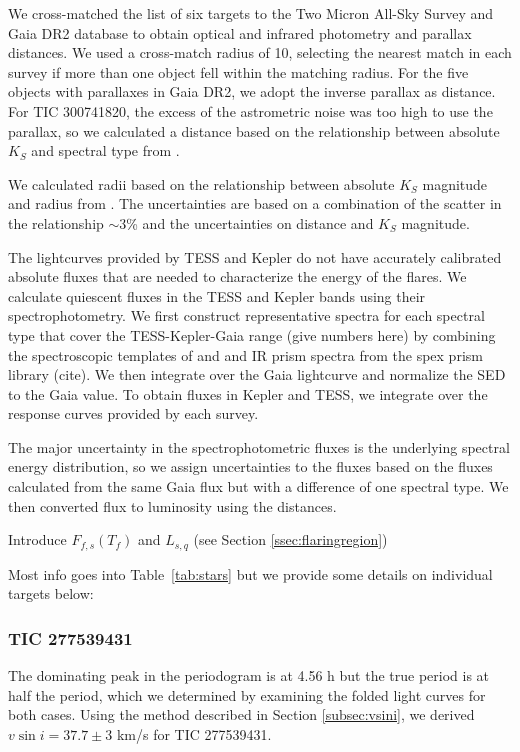 \documentclass[fleqn,usenatbib,letters]{mnras}%
\newcommand{\FA}{TIC 277539431} %
\newcommand{\FF}{TIC 300741820} %
\begin{document}
We cross-matched the list of six targets to the Two Micron All-Sky Survey \citep[2MASS;][]{Skrutskie2006} and Gaia \citep{gaiacollaboration2016} DR2 database \citep{gaiacollaboration2018} to obtain optical and infrared photometry and parallax distances. We used a cross-match radius of 10\arcsec, selecting the nearest match in each survey if more than one object fell within the matching radius. For the five objects with parallaxes in Gaia DR2, we adopt the inverse parallax as distance. For \FF, the excess of the astrometric noise was too high to use the parallax, so we calculated a distance based on the relationship between absolute $K_S$ and spectral type from \citet{dupuy2012}.

We calculated radii based on the relationship between absolute $K_S$ magnitude and radius from \citet{Mann2015}. The uncertainties are based on a combination of the scatter in the relationship $\sim3$\% and the uncertainties on distance and $K_S$ magnitude.

The lightcurves provided by TESS and Kepler do not have accurately calibrated absolute fluxes that are needed to characterize the energy of the flares. We calculate quiescent fluxes in the TESS and Kepler bands using their spectrophotometry. We first construct representative spectra for each spectral type that cover the TESS-Kepler-Gaia range (give numbers here) by combining the spectroscopic templates of \citet{Bochanski2007} and \citet{Schmidt2014a} and IR prism spectra from the spex prism library (cite). We then integrate over the Gaia lightcurve and normalize the SED to the Gaia value. To obtain fluxes in Kepler and TESS, we integrate over the response curves provided by each survey.

The major uncertainty in the spectrophotometric fluxes is the underlying spectral energy distribution, so we assign uncertainties to the fluxes based on the fluxes calculated from the same Gaia flux but with a difference of one spectral type. We then converted flux to luminosity using the distances.

Introduce $F_{f,s}(T_f)$ and $L_{s,q}$ (see Section \ref{ssec:flaringregion})

Most info goes into Table~\ref{tab:stars} but we provide some details on individual targets below:

\subsubsection{\FA}
\label{sec:propsA}
The dominating peak in the periodogram is at 4.56 h but the true period is at half the period, which we determined by examining the folded light curves for both cases.
Using the method described in Section \ref{subsec:vsini}, we derived $v\sin i=37.7\pm3$ km/s for \FA.
\end{document}
